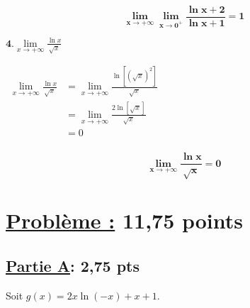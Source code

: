 \documentclass[12pt,a4paper]{article}
\begin{document}
\begin{resultbox}
    \[
        \mathbf{\lim\limits_{x \to +\infty} \lim\limits_{x \to 0^+} \frac{\ln x+2}{\ln x+1}=1}
    \]
\end{resultbox}

\(
\textbf{4.} \lim\limits_{x \to +\infty} \frac{\ln x}{\sqrt{x}}
\)

\(
\begin{aligned}
    \lim\limits_{x \to +\infty} \frac{\ln x}{\sqrt{x}} & =\lim\limits_{x \to +\infty} \frac{\ln\left[(\sqrt{x})^{2}\right] }{\sqrt{x}} \\
                                                       & =\lim\limits_{x \to +\infty} \frac{2\ln\left[\sqrt{x}\right] }{\sqrt{x}}      \\
                                                       & =0                                                                            \\
\end{aligned}
\)

\begin{resultbox}
    \[
        \mathbf{\lim\limits_{x \to +\infty} \frac{\ln x}{\sqrt{x}}=0}
    \]
\end{resultbox}

\section*{\underline{Problème :} 11,75 points }
\subsection*{\underline{\textbf{Partie A}}:\textbf{ 2,75 pts}}

Soit \( g(x) = 2x \ln(-x) + x + 1 \).
\end{document}
